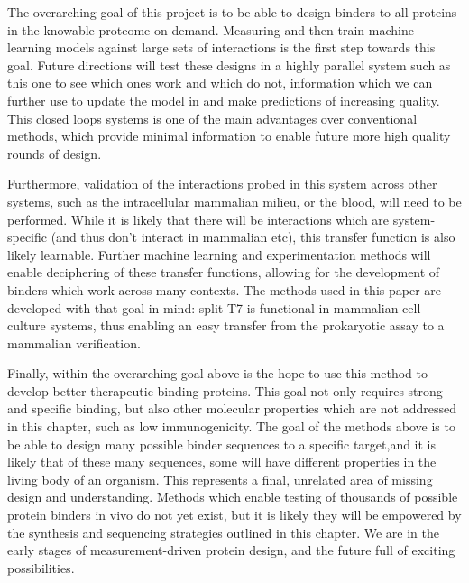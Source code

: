 The overarching  goal of this project is to be able to design binders to all proteins in the knowable proteome on demand. Measuring and then train machine learning models against large sets of interactions is the first step towards this goal. Future directions will test these designs in a highly parallel system such as this one to see which ones work and which do not, information which we can further use to update the model in and make predictions of increasing quality. This closed loops systems is one of the main advantages over conventional methods, which provide minimal information to enable future more high quality rounds of design. 

Furthermore, validation of the interactions probed in this system across other systems, such as the intracellular mammalian milieu, or the blood, will need to be performed. While it is likely that there will be interactions which are system-specific (and thus don't interact in mammalian etc), this transfer function is also likely learnable. Further machine learning and experimentation methods will enable deciphering of these transfer functions, allowing for the development of binders which work across many contexts. The methods used in this paper are developed with that goal in mind: split T7 is functional in mammalian cell culture systems, thus enabling an easy transfer from the prokaryotic assay to a mammalian verification. 

Finally, within the overarching goal above is the hope to use this method to develop better therapeutic binding proteins. This goal not only requires strong and specific binding, but also other molecular properties which are not addressed in this chapter, such as low immunogenicity. The goal of the methods above is to be able to design many possible binder sequences to a specific target,and it is likely that of these many sequences, some will have different properties in the living body of an organism. This represents a final, unrelated area of missing design and understanding.  Methods which enable testing of thousands of possible protein binders in vivo do not yet exist, but it is likely they will be empowered by the synthesis and sequencing strategies outlined in this chapter. We are in the early stages of measurement-driven protein design, and the future full of exciting possibilities. 